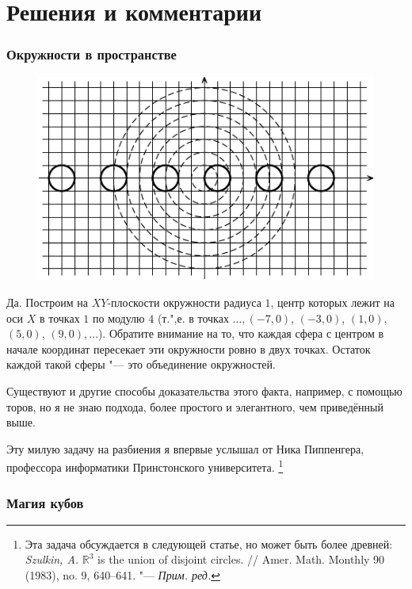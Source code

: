\documentclass[twoside]{book}
\begin{document}

\section*{Решения и комментарии}

\subsubsection*{Окружности в пространстве}%

\begin{figure}[b]
  \vspace{-\jot}
\centering
\includegraphics {mp/wink-10}
\end{figure} 

Да.
Построим на $XY$-плоскости окружности радиуса $1$, центр которых лежит на оси $X$ в точках $1$ по модулю $4$ (т.",е. в точках $\dots, (-7,0)$, $(-3,0)$, $(1,0)$, $(5,0)$, $(9,0),\dots$).
Обратите внимание на то, что каждая сфера с центром в начале координат пересекает эти окружности ровно в двух точках.
Остаток каждой такой сферы "--- это объединение окружностей.
\heart


Существуют и другие способы доказательства этого факта, например, с помощью торов, но я не знаю подхода, более простого и элегантного, чем приведённый выше.

Эту милую задачу на разбиения я впервые услышал от Ника Пиппенгера, %
профессора информатики Принстонского университета.
\footnote{Эта задача обсуждается в следующей статье, но может быть более древней: 
\emph{Szulkin, A.} $\mathbb{R}^3$ is the union of disjoint circles. /\!/ Amer. Math. Monthly 90 (1983), no. 9, 640--641. "--- \emph{Прим. ред.}}

\subsubsection*{Магия кубов}%
\end{document}
